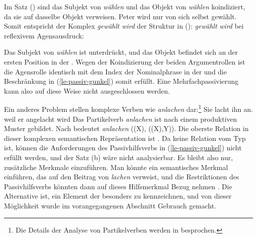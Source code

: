 {Im Satz () sind das Subjekt von \emph{wählen} und das Objekt von \emph{wählen}
koindiziert, da sie auf dasselbe Objekt verweisen.
\ea
Peter wird nur von sich selbst gewählt.
\z
Somit entspricht der Komplex \emph{gewählt wird} der Struktur in ():
\eas
\emph{gewählt wird} bei reflexivem Agensausdruck:\\[1mm]
\zs

\noindent
Das Subjekt von \emph{wählen} ist unterdrückt, und das Objekt befindet sich an der ersten
Position in der \compsl. Wegen der Koindizierung der beiden Argumentrollen ist die
Agensrolle identisch mit dem Index der Nominalphrase in der \compsl und die Beschränkung
in (\ref{le-passiv-gunkel}) somit erfüllt. Eine Mehrfachpassivierung kann also auf diese Weise
nicht ausgeschlossen werden.

Ein anderes Problem stellen komplexe Verben wie \emph{anlachen} dar:\footnote{Die Details
der Analyse von Partikelverben werden in  besprochen.}
\largerpage[2]
\eal
\ex Sie lacht ihn an.
\ex weil er angelacht wird
\zl
Das Partikelverb \emph{anlachen} ist nach einem produktiven Muster gebildet. Nach
 bedeutet \emph{anlachen} ((X), ((X),Y)).
Die oberste Relation in dieser komplexen semantischen Repräsentation ist .
Da  keine Relation vom Typ  ist, können die Anforderungen
des Passivhilfsverbs in (\ref{le-passiv-gunkel}) nicht erfüllt werden, und der
Satz (b) wäre nicht analysierbar. Es bleibt also nur, zusätzliche Merkmale einzuführen.
Man könnte ein semantisches Merkmal einführen, das
auf den Beitrag von \emph{lachen} verweist, und die Restriktionen des Passivhilfsverbs
könnten dann auf dieses Hilfsmerkmal Bezug nehmen \parencites[299]{MRS}[239, 241]{MK2000a}. Die
Alternative ist, ein Element der \argstl besonders zu kennzeichnen, und von dieser Möglichkeit wurde
im vorangegangenen Abschnitt Gebrauch gemacht.

}
